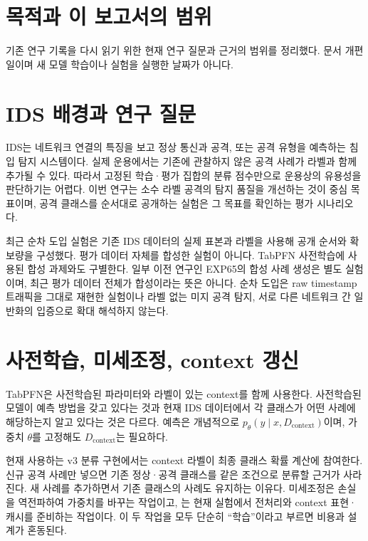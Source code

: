 




\section*{목적과 이 보고서의 범위}

기존 연구 기록을 다시 읽기 위한 현재 연구 질문과 근거의 범위를 정리했다. 문서 개편일이며 새 모델 학습이나 실험을 실행한 날짜가 아니다.


\section{IDS 배경과 연구 질문}
IDS는 네트워크 연결의 특징을 보고 정상 통신과 공격, 또는 공격 유형을 예측하는 침입 탐지 시스템이다.
실제 운용에서는 기존에 관찰하지 않은 공격 사례가 라벨과 함께 추가될 수 있다.
따라서 고정된 학습·평가 집합의 분류 점수만으로 운용상의 유용성을 판단하기는 어렵다.
이번 연구는 소수 라벨 공격의 탐지 품질을 개선하는 것이 중심 목표이며,
공격 클래스를 순서대로 공개하는 실험은 그 목표를 확인하는 평가 시나리오다.

최근 순차 도입 실험은 기존 IDS 데이터의 실제 표본과 라벨을 사용해 공개 순서와 확보량을 구성했다.
평가 데이터 자체를 합성한 실험이 아니다. TabPFN 사전학습에 사용된 합성 과제와도 구별한다.
일부 이전 연구인 EXP65의 합성 사례 생성은 별도 실험이며, 최근 평가 데이터 전체가 합성이라는 뜻은 아니다.
순차 도입은 raw timestamp 트래픽을 그대로 재현한 실험이나 라벨 없는 미지 공격 탐지,
서로 다른 네트워크 간 일반화의 입증으로 확대 해석하지 않는다.

\section{사전학습, 미세조정, context 갱신}
TabPFN은 사전학습된 파라미터와 라벨이 있는 context를 함께 사용한다.
사전학습된 모델이 예측 방법을 갖고 있다는 것과 현재 IDS 데이터에서 각 클래스가 어떤 사례에 해당하는지
알고 있다는 것은 다르다. 예측은 개념적으로 $p_\theta(y\mid x,D_{\mathrm{context}})$이며,
가중치 $\theta$를 고정해도 $D_{\mathrm{context}}$는 필요하다.

현재 사용하는 v3 분류 구현에서는 context 라벨이 최종 클래스 확률 계산에 참여한다.
신규 공격 사례만 넣으면 기존 정상·공격 클래스를 같은 조건으로 분류할 근거가 사라진다.
새 사례를 추가하면서 기존 클래스의 사례도 유지하는 이유다.
미세조정은 손실을 역전파하여 가중치를 바꾸는 작업이고,
는 현재 실험에서 전처리와 context 표현·캐시를 준비하는 작업이다.
이 두 작업을 모두 단순히 ``학습''이라고 부르면 비용과 설계가 혼동된다.

